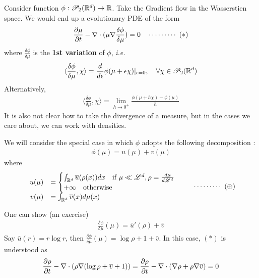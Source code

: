 \documentclass[12pt,a4paper]{article}
\begin{document}
Consider function $\phi : \mathscr{P}_2(\mathbb{R}^d) \rightarrow \mathbb{R}$. Take the Gradient flow in the Wasserstien space. We would end up a evolutionary PDE of the form
\begin{align*}
\frac{\partial \mu}{\partial t} - \nabla \cdot (\mu \nabla \frac{\delta \phi}{\delta \mu}) =0 \quad \cdots\cdots\cdots\,\,(*)
\end{align*}
where $\frac{\delta \phi}{\delta \mu}$ is the \textbf{1st variation} of $\phi$, \textit{i.e.}
\begin{align*}
\langle \frac{\delta \phi}{\delta \mu}, \chi \rangle = \frac{d}{d\epsilon} \phi(\mu + \epsilon \chi) |_{\epsilon =0}, \quad \forall \chi \in \mathscr{P}_2(\mathbb{R}^d)
\end{align*}
Alternatively,
\begin{align*}
\langle \frac{\delta \phi}{\delta \mu}, \chi \rangle =\lim_{h\rightarrow 0^+} \frac{\phi(\mu + h\chi)- \phi(\mu)}{h}
\end{align*}
It is also not clear how to take the divergence of a measure, but in the cases we care about, we can work with densities.
\s

We will consider the special case in which $\phi$ adopts the following decomposition :
\begin{align*}
\phi(\mu) = u(\mu) + v(\mu)
\end{align*}
where
\begin{align*}
\begin{array}{rl}
u(\mu) &= \begin{cases}
\int_{\mathbb{R}^d} \overline{u}(\rho(x)) dx \quad \text{if } \mu \ll \mathscr{L}^d, \rho = \frac{d\mu}{d \mathscr{L}^d} \\
+ \infty \quad \text{otherwise}
\end{cases} \\
v(\mu) &=\int_{\mathbb{R}^d} \overline{v}(x)d\mu(x) 
\end{array}\quad \cdots\cdots\cdots\,\,(\oplus)
\end{align*}

One can show (an exercise)
\begin{align*}
\frac{\delta \phi}{\delta\mu}(\mu) = \bar{u}'(\rho ) + \bar{v}
\end{align*}
Say $\bar{u}(r) =r\log r$, then $\frac{\delta \phi}{\delta \mu}(\mu) = \log \rho + 1 +\bar{v}$. In this case, $(*)$ is understood as
\begin{align*}
\frac{\partial \rho}{\partial t} - \nabla \cdot (\rho \nabla (\log \rho + \overline{v} +1)) = \frac{\partial \rho}{\partial t} - \nabla \cdot(\nabla \rho + \rho\nabla \overline{v}) = 0
\end{align*}
\s
\end{document}
